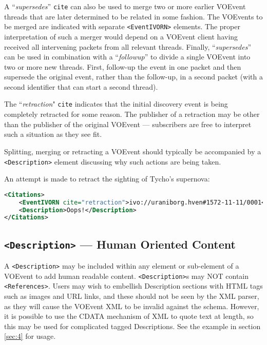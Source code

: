 \documentclass[11pt,a4paper]{ivoa}
\begin{document}
A ``\emph{supersedes}'' {\tt cite} can also be used to merge two or more earlier
VOEvent threads that are later determined to be related in some fashion. The
VOEvents to be merged are indicated with separate {\tt <EventIVORN>} elements.
The proper interpretation of such a merger would depend on a VOEvent client
having received all intervening packets from all relevant threads. Finally,
``\emph{supersedes}'' can be used in combination with a ``\emph{followup}'' to
divide a single VOEvent into two or more new threads. First, follow-up the event
in one packet and then supersede the original event, rather than the follow-up,
in a second packet (with a second identifier that can start a second thread).

The ``\emph{retraction}" {\tt cite} indicates that the initial discovery event
is being completely retracted for some reason. The publisher of a retraction may
be other than the publisher of the original VOEvent --- subscribers are free to
interpret such a situation as they see fit.

Splitting, merging or retracting a VOEvent should typically be accompanied by a
{\tt <Description>} element discussing why such actions are being taken.

An attempt is made to retract the sighting of Tycho's supernova:
\begin{lstlisting}[language=XML]
<Citations>
    <EventIVORN cite="retraction">ivo://uraniborg.hven#1572-11-11/0001</EventIVORN>
    <Description>Oops!</Description>
</Citations>
\end{lstlisting}

\subsection{{\tt <Description>} --- Human Oriented Content}
\label{sec:3.8}
A {\tt <Description>} may be included within any element or sub-element of a
VOEvent to add human readable content. {\tt <Description>}s may NOT contain {\tt
<References>}. Users may wish to embellish Description sections with HTML tags
such as images and URL links, and these should not be seen by the XML parser, as
they will cause the VOEvent XML to be invalid against the schema. However, it is
possible to use the CDATA mechanism of XML to quote text at length, so this may
be used for complicated tagged Descriptions. See the example in section
\ref{sec:4} for usage.
\end{document}
